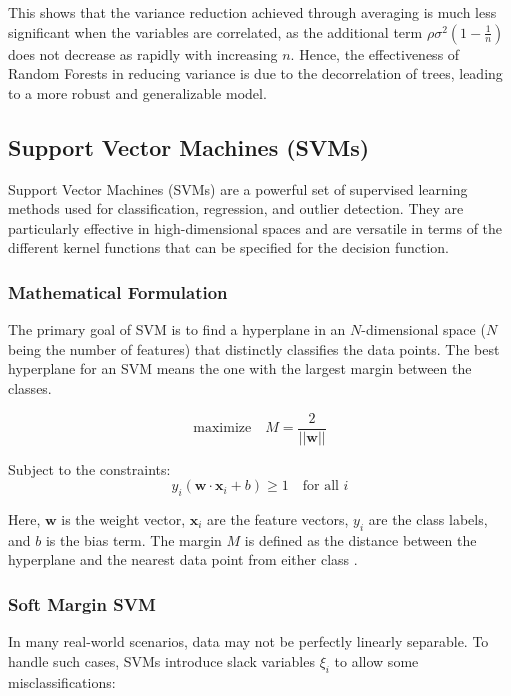 \documentclass[english,11pt,a4paper,titlepage]{article}
\begin{document}
	This shows that the variance reduction achieved through averaging is much less significant when the variables are correlated, as the additional term \( \rho\sigma^2\left(1 - \frac{1}{n}\right) \) does not decrease as rapidly with increasing \( n \). Hence, the effectiveness of Random Forests in reducing variance is due to the decorrelation of trees, leading to a more robust and generalizable model.
	
	\subsection*{Support Vector Machines (SVMs)}
	Support Vector Machines (SVMs) are a powerful set of supervised learning methods used for classification, regression, and outlier detection. They are particularly effective in high-dimensional spaces and are versatile in terms of the different kernel functions that can be specified for the decision function.
	
	\subsubsection*{Mathematical Formulation}
	The primary goal of SVM is to find a hyperplane in an \( N \)-dimensional space (\( N \) being the number of features) that distinctly classifies the data points. The best hyperplane for an SVM means the one with the largest margin between the classes.
	
	\begin{equation*}
		\text{maximize} \quad M = \frac{2}{||\mathbf{w}||}
	\end{equation*}
	
	Subject to the constraints:
	\begin{equation*}
		y_i (\mathbf{w} \cdot \mathbf{x}_i + b) \geq 1 \quad \text{for all } i
	\end{equation*}
	
	Here, \( \mathbf{w} \) is the weight vector, \( \mathbf{x}_i \) are the feature vectors, \( y_i \) are the class labels, and \( b \) is the bias term. The margin \( M \) is defined as the distance between the hyperplane and the nearest data point from either class \cite{hastieElementsStatisticalLearning2009,cortesSupportvectorNetworks1995}. 
	
	\subsubsection*{Soft Margin SVM}
	In many real-world scenarios, data may not be perfectly linearly separable. To handle such cases, SVMs introduce slack variables \( \xi_i \) to allow some misclassifications:
	
\end{document}
